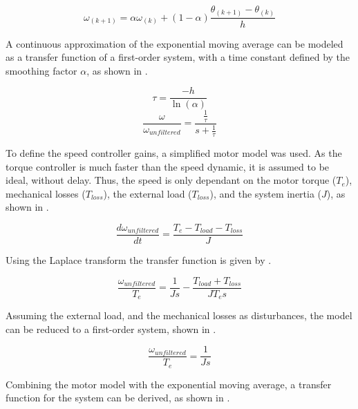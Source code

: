 \begin{equation}
	\omega_{(k+1)} = \alpha \omega_{(k)} + (1-\alpha) \frac{\theta_{(k+1)} - \theta_{(k)}}{h}
	\label{eq:rotor_speed}
\end{equation}

A continuous approximation of the exponential moving average can be modeled as a transfer function of a first-order system, with a time constant defined by the smoothing factor $\alpha$, as shown in .


\begin{equation}
	\tau = \frac{-h}{\ln(\alpha)}
	\label{eq:time_constant}
\end{equation}
\begin{equation}
		\frac{\omega}{\omega_{unfiltered}} = \frac{\frac{1}{\tau}}{s+\frac{1}{\tau}}
	\label{eq:exp_moving_average}
\end{equation}

To define the speed controller gains, a simplified motor model was used. As the torque controller is much faster than the speed dynamic, it is assumed to be ideal, without delay. Thus, the speed is only dependant on the motor torque ($T_{e}$), mechanical losses ($T_{loss}$), the external load ($T_{loss}$), and the system inertia ($J$), as shown in .

\begin{equation}
		\frac{d\omega_{unfiltered}}{dt} = \frac{T_e-T_{load} - T_{loss}}{J}
	\label{eq:speed_model}
\end{equation}

Using the Laplace transform the transfer function is given by .

\begin{equation}
		\frac{\omega_{unfiltered}}{T_e} = \frac{1}{J s}-\frac{T_{load} + T_{loss}}{J T_e s}
	\label{eq:speed_tf}
\end{equation}

Assuming the external load, and the mechanical losses as disturbances, the model can be reduced to a first-order system, shown in .

\begin{equation}
		\frac{\omega_{unfiltered}}{T_e} = \frac{1}{J s}
	\label{eq:speed_tf_reduced}
\end{equation}

Combining the motor model with the exponential moving average, a transfer function for the system can be derived, as shown in .


